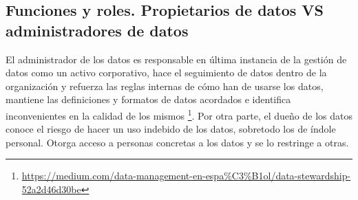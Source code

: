 \documentclass{article}
\begin{document}
\subsection{Funciones y roles. Propietarios de datos VS administradores de datos}
El administrador de los datos es responsable en última instancia de la gestión de datos como un activo corporativo, hace el seguimiento de datos dentro de la organización y refuerza las reglas internas de cómo han de usarse los datos, mantiene las definiciones y formatos de datos acordados e identifica inconvenientes en la calidad de los mismos \footnote{\url{https://medium.com/data-management-en-espa\%C3\%B1ol/data-stewardship-52a2d46d30be}}. Por otra parte, el dueño de los datos conoce el riesgo de hacer un uso indebido de los datos, sobretodo los de índole personal. Otorga acceso a personas concretas a los datos y se lo restringe a otras.
\end{document}
